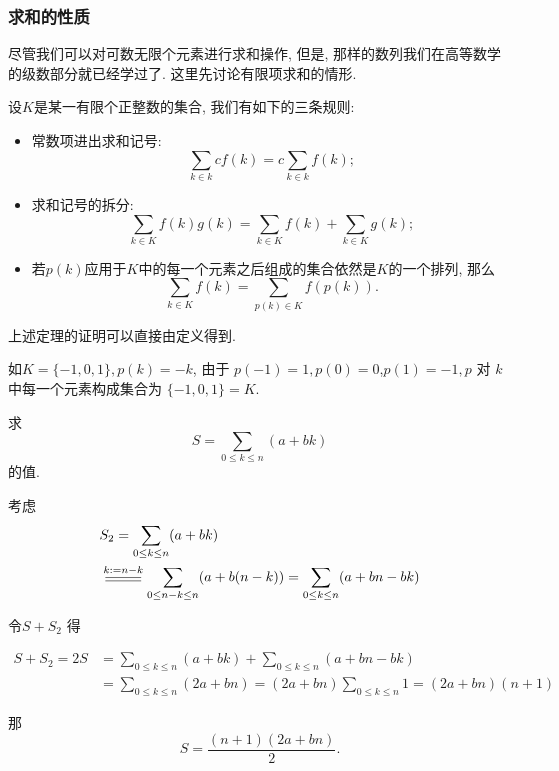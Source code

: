 \documentclass{ctexart}
\begin{document}
\subsubsection{求和的性质}

尽管我们可以对可数无限个元素进行求和操作, 但是, 那样的数列我们在高等数学的级数部分就已经学过了. 这里先讨论有限项求和的情形.

\begin{theorem}\label{thm:sum-prop}
	设$K$是某一有限个正整数的集合, 我们有如下的三条规则:

	\begin{itemize}
		\item 常数项进出求和记号: $$
			      \sum_{k \in k} c f(k)=c \sum_{k \in k} f(k);
		      $$
		\item 求和记号的拆分: $$
			      \sum_{k \in K} f(k) g(k)=\sum_{k \in K} f(k)+\sum_{k \in K} g(k);
		      $$
		\item 若$p(k)$应用于$K$中的每一个元素之后组成的集合依然是$K$的一个排列, 那么$$
			      \sum_{k \in K} f(k)=\sum_{p(k) \in K} f(p(k)).
		      $$
	\end{itemize}
\end{theorem}

上述定理的证明可以直接由定义得到.

\begin{example}
	如$K=\{-1,0,1\}, p(k)=-k$, 由于 $p(-1)=1, p(0)=0$,$p(1)=-1 , p$ 对 $k$ 中每一个元素构成集合为 $\{-1,0,1\}=K$.
\end{example}

\begin{example}[等差数列求和]
	求 $$
		S=\sum_{0 \leq k \leq n}(a+b k)
	$$的值.

	考虑
	$$
		\begin{aligned}
			 & S_2=\sum_{0 \leq k \leq n}(a+b k)                                                           \\
			 & \varsub{k:=n-k}{0.9cm} \sum_{0 \leq n-k \leq n}(a+b(n-k))=\sum_{0 \leq k \leq n}(a+b n-b k)
		\end{aligned}
	$$

	令$S+S_2$ 得

	$$
		\begin{aligned}
			S+S_2=2 S & =\sum_{0 \leq k \leq n}(a+b k)+\sum_{0 \leq k \leq n}(a+b n-b k)                   \\
			          & =\sum_{0 \leq k \leq n}(2 a+b n)=(2 a+b n) \sum_{0 \leq k \leq n} 1=(2 a+b n)(n+1)
		\end{aligned}
	$$

	那 $$
		S=\frac{(n+1)(2 a+b n)}{2}.
	$$

\end{example}
\end{document}
